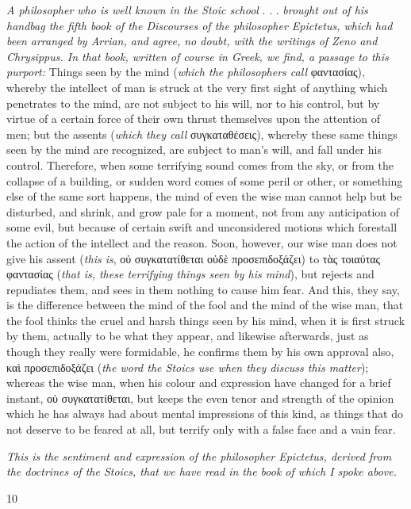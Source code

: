 \emph{A philosopher who is well known in the Stoic school} . . . \emph{brought out of his handbag the fifth book of the Discourses of the philosopher Epictetus, which had been arranged by Arrian, and agree, no doubt, with the writings of Zeno and Chrysippus. In that book, written of course in Greek, we find, a passage to this purport:} Things seen by the mind (\emph{which the philosophers call} φαντασίας), whereby the intellect of man is struck at the very first sight of anything which penetrates to the mind, are not subject to his will, nor to his control, but by virtue of a certain force of their own thrust themselves upon the attention of men; but the assents (\emph{which they call} συγκαταθέσεις), whereby these same things seen by the mind are recognized, are subject to man's will, and fall under his control. Therefore, when some terrifying sound comes from the sky, or from the collapse of a building, or sudden word comes of some peril or other, or something else of the same sort happens, the mind of even the wise man cannot help but be disturbed, and shrink, and grow pale for a moment, not from any anticipation of some evil, but because of certain swift and unconsidered motions which forestall the action of the intellect and the reason. Soon, however, our wise man does not give his assent (\emph{this is}, οὑ συγκατατίθεται οὐδὲ προσεπιδοξάζει) to τὰς τοιαύτας φαντασίας (\emph{that is, these terrifying things seen by his mind}), but rejects and repudiates them, and sees in them nothing to cause him fear. And this, they say, is the difference between the mind of the fool and the mind of the wise man, that the fool thinks the cruel and harsh things seen by his mind, when it is first struck by them, actually to be what they appear, and likewise afterwards, just as though they really were formidable, he confirms them by his own approval also, καὶ προσεπιδοξάζει (\emph{the word the Stoics use when they discuss this matter}); whereas the wise man, when his colour and expression have changed for a brief instant, οὑ συγκατατίθεται, but keeps the even tenor and strength of the opinion which he has always had about mental impressions of this kind, as things that do not deserve to be feared at all, but terrify only with a false face and a vain fear.

\emph{This is the sentiment and expression of the philosopher Epictetus, derived from the doctrines of the Stoics, that we have read in the book of which I spoke above.}

10

